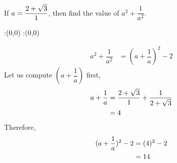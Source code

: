 



\question[3] If $a=\dfrac{2+\sqrt{3}}{1}$, then find the value of
$a^2+\dfrac{1}{a^2}$.


\watchout

\ifprintanswers
  \begin{marginfigure}
      :(0,0)
      :(0,0)
    \figdrawbegin{}
      \figdrawline [100,101]
    \figdrawend
    \figvisu{\figBoxA}{}{%
    }
    \centerline{\box\figBoxA}
  \end{marginfigure}
\fi 

\begin{solution}[\halfpage]

  \begin{align}
    a^2 + \dfrac{1}{a^2} &= (a + \dfrac{1}{a})^2 - 2 
  \end{align}
  Let us compute $(a+\dfrac{1}{a})$ first,
  \begin{align}
    a+\dfrac{1}{a} &= \dfrac{2 + \sqrt{3}}{1} + \dfrac{1}{2 + \sqrt{3}} \\   
                   &= 4
  \end{align}
  Therefore, 
  \begin{align}
    (a+\dfrac{1}{a})^2 - 2 &= (4)^2 - 2 \\
                           &= 14
  \end{align}

\end{solution}

